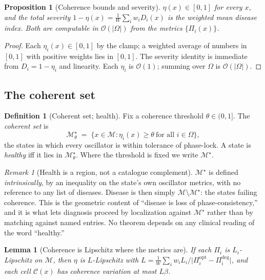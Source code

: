 \documentclass[11pt,a4paper]{article}
\theoremstyle{cfcthm}
\newtheorem{lemma}[theorem]{Lemma}
\newtheorem{proposition}[theorem]{Proposition}
\theoremstyle{definition}
\newtheorem{definition}[theorem]{Definition}
\theoremstyle{remark}
\newtheorem{remark}[theorem]{Remark}
\newcommand{\Man}{\mathcal{M}}          %
\newcommand{\st}{x}                     %
\newcommand{\Coh}{\Man^{\star}}         %
\newcommand{\flo}{\beta}                %
\newcommand{\cell}{\mathcal{C}}         %
\newcommand{\ecoh}{\eta}                %
\newcommand{\Dom}{\Omega}               %
\newcommand{\abs}[1]{\lvert#1\rvert}
\newcommand{\set}[1]{\{#1\}}
\begin{document}
\begin{proposition}[Coherence bounds and severity]
\label{prop:coherence-bounds}
$\ecoh(\st)\in[0,1]$ for every $\st$, and the total severity
$1-\ecoh(\st)=\tfrac1W\sum_i w_i D_i(\st)$ is the weighted mean disease index.
Both are computable in $\mathcal{O}(|\Dom|)$ from the metrics
$\set{\Pi_i(\st)}$.
\end{proposition}

\begin{proof}
Each $\ecoh_i(\st)\in[0,1]$ by the clamp; a weighted average of numbers in
$[0,1]$ with positive weights lies in $[0,1]$. The severity identity is
immediate from $D_i=1-\ecoh_i$ and linearity. Each $\ecoh_i$ is
$\mathcal{O}(1)$; summing over $\Dom$ is $\mathcal{O}(|\Dom|)$.
\end{proof}

\subsection{The coherent set}

\begin{definition}[Coherent set; health]
\label{def:coherent}
Fix a coherence threshold $\theta\in(0,1]$. The \emph{coherent set} is
\begin{equation}
\Coh_\theta\;=\;\set{\st\in\Man:\ecoh_i(\st)\ge\theta\ \text{for all }i\in\Dom},
\label{eq:coherent}
\end{equation}
the states in which every oscillator is within tolerance of phase-lock. A
state is \emph{healthy} iff it lies in $\Coh_\theta$. Where the threshold is
fixed we write $\Coh$.
\end{definition}

\begin{remark}[Health is a region, not a catalogue complement]
\label{rem:health-region}
$\Coh$ is defined \emph{intrinsically}, by an inequality on the state's own
oscillator metrics, with no reference to any list of diseases. Disease is then
simply $\Man\setminus\Coh$: the states failing coherence. This is the geometric
content of ``disease is loss of phase-consistency,'' and it is what lets
diagnosis proceed by localization against $\Coh$ rather than by matching
against named entries. No theorem depends on any clinical reading of the word
``healthy.''
\end{remark}

\begin{lemma}[Coherence is Lipschitz where the metrics are]
\label{lem:coherence-lipschitz}
If each $\Pi_i$ is $L_i$-Lipschitz on $\Man$, then $\ecoh$ is
$L$-Lipschitz with
$L=\tfrac1W\sum_i w_i L_i/\abs{\Pi_i^{\mathrm{opt}}-\Pi_i^{\mathrm{deg}}}$, and
each cell $\cell(\st)$ has coherence variation at most $L\flo$.
\end{lemma}
\end{document}

